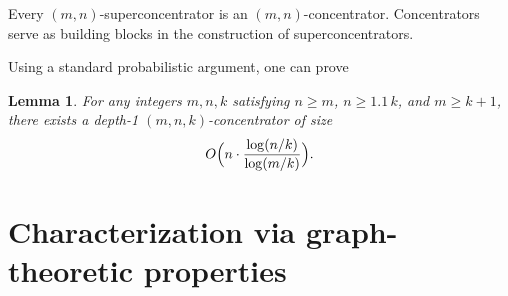 \documentclass[11pt]{article}
\newtheorem{lemma}{Lemma}
\begin{document}
Every $(m, n)$-superconcentrator is an $(m, n)$-concentrator. Concentrators serve as building blocks in the construction of superconcentrators.

Using a standard probabilistic argument, one can prove 
\begin{lemma}
\label{lem:linear_concentrator}
\cite{pinsker1973complexity, DDPW83} 
For any integers $m, n, k$ satisfying $n \ge m$, $n \ge 1.1\,k$, and $m \ge k+1$, there exists a depth-1 $(m, n, k)$-concentrator of size
\[
O\Bigl(n \cdot \frac{\log(n/k)}{\log(m/k)}\Bigr).
\]
\end{lemma}



\section{Characterization via graph-theoretic properties}
\end{document}
